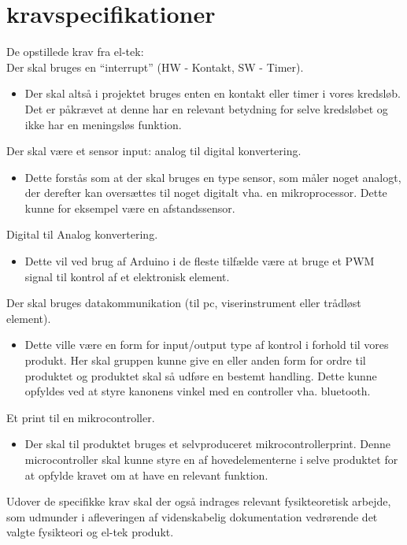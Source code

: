 \section{kravspecifikationer}

De opstillede krav fra el-tek:\\

Der skal bruges en “interrupt” (HW - Kontakt, SW - Timer).
\begin{itemize}
\item Der skal altså i projektet bruges enten en kontakt eller timer i vores kredsløb. Det er påkrævet at denne har en relevant betydning for selve kredsløbet og ikke har en meningsløs funktion.
\end{itemize}



Der skal være et sensor input: analog til digital konvertering.
\begin{itemize}
\item Dette forstås som at der skal bruges en type sensor, som måler noget analogt, der derefter kan oversættes til noget digitalt vha. en mikroprocessor. Dette kunne for eksempel være en afstandssensor.
\end{itemize}

Digital til Analog konvertering.
\begin{itemize}
\item Dette vil ved brug af Arduino i de fleste tilfælde være at bruge et PWM signal til kontrol af et elektronisk element.
\end{itemize}


Der skal bruges datakommunikation (til pc, viserinstrument eller trådløst element).
\begin{itemize}
\item Dette ville være en form for input/output type af kontrol i forhold til vores produkt. Her skal gruppen kunne give en eller anden form for ordre til produktet og produktet skal så udføre en bestemt handling. Dette kunne opfyldes ved at styre kanonens vinkel med en controller vha. bluetooth.
\end{itemize}

Et print til en mikrocontroller.
\begin{itemize}
\item Der skal til produktet bruges et selvproduceret mikrocontrollerprint. Denne microcontroller skal kunne styre en af hovedelementerne i selve produktet for at opfylde kravet om at have en relevant funktion.
\end{itemize}

Udover de specifikke krav skal der også indrages relevant fysikteoretisk arbejde, som udmunder i afleveringen af videnskabelig dokumentation vedrørende det valgte fysikteori og el-tek produkt.
